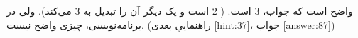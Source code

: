 \section{}
\paragraph{}\label{hint:246}
واضح است که جواب، 3 است. ( 2 است و یک \lr{\texttt{++}} دیگر آن را تبدیل به 3 می‌کند). ولی در برنامه‌نویسی، چیزی واضح نیست. (راهنماییِ بعدی \ref{hint:37}، جواب \ref{answer:87})